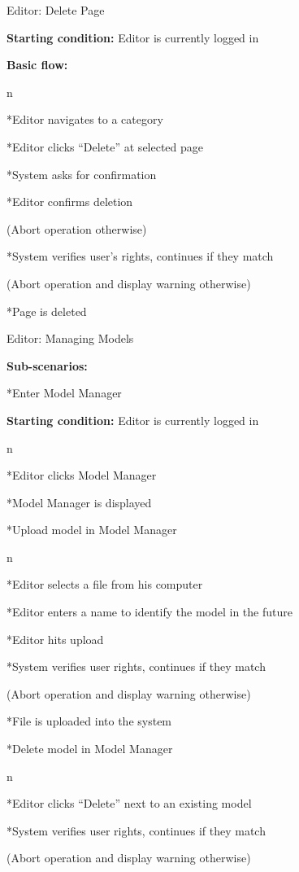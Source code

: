 \secc Editor: Delete Page

{\bf Starting condition:} Editor is currently logged in

{\bf Basic flow:}

\begitems \style n

*Editor navigates to a category

*Editor clicks “Delete” at selected page

*System asks for confirmation

*Editor confirms deletion

(Abort operation otherwise)

*System verifies user’s rights, continues if they match

(Abort operation and display warning otherwise)

*Page is deleted

\enditems

\secc Editor: Managing Models

{\bf Sub-scenarios:}

\begitems

*Enter Model Manager

{\bf Starting condition:} Editor is currently logged in

\begitems \style n

*Editor clicks Model Manager

*Model Manager is displayed

\enditems

*Upload model in Model Manager

\begitems \style n

*Editor selects a file from his computer

*Editor enters a name to identify the model in the future

*Editor hits upload

*System verifies user rights, continues if they match

(Abort operation and display warning otherwise)

*File is uploaded into the system

\enditems

*Delete model in Model Manager

\begitems \style n

*Editor clicks “Delete” next to an existing model

*System verifies user rights, continues if they match

(Abort operation and display warning otherwise)

